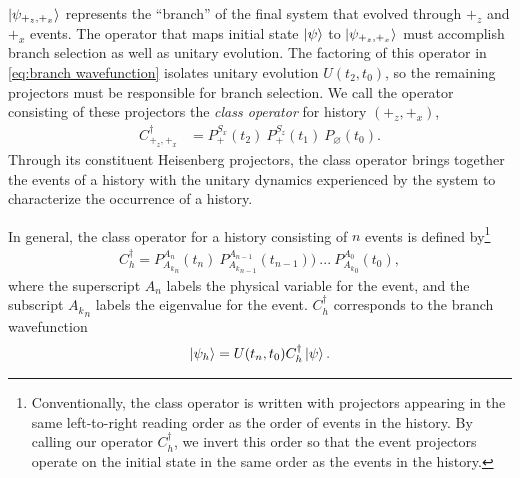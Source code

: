 $\ket{\psi_{+_z, +_x}}$ represents the ``branch'' of the final system that evolved through $+_z$ and $+_x$ events. The operator that maps initial state $\ket{\psi}$ to $\ket{\psi_{+_z, +_x}}$ must accomplish branch selection as well as unitary evolution. The factoring of this operator in \autoref{eq:branch wavefunction} isolates unitary evolution $U(t_2, t_0)$, so the remaining projectors must be responsible for branch selection. We call the operator consisting of these projectors the \textit{class operator} for history $\left(+_z, +_x\right)$,
\begin{align}
    C^\dagger_{+_z, +_x} &= {P^{S_x}_+(t_2)} \: {P^{S_z}_+(t_1)} \: {P_\varnothing(t_0)}.
\end{align}
Through its constituent Heisenberg projectors, the class operator brings together the events of a history with the unitary dynamics experienced by the system to characterize the occurrence of a history.

In general, the class operator for a history consisting of $n$ events is defined by\footnote{Conventionally, the class operator is written with projectors appearing in the same left-to-right reading order as the order of events in the history. By calling our operator $C_h^\dagger$, we invert this order so that the event projectors operate on the initial state in the same order as the events in the history.}
\begin{align}
  C_h^\dagger = P^{A_n}_{{A_k}_n}(t_n) \: P^{A_{n-1}}_{{A_k}_{n-1}}(t_{n-1})) \: ... \: P^{A_0}_{{A_k}_0}(t_0),
\end{align}
where the superscript $A_n$ labels the physical variable for the event, and the subscript ${A_k}_n$ labels the eigenvalue for the event. $C_h^\dagger$ corresponds to the branch wavefunction
\begin{align}
  \ket{\psi_h} = U(t_n, t_0) C_h^\dagger \ket{\psi}.
\end{align}

